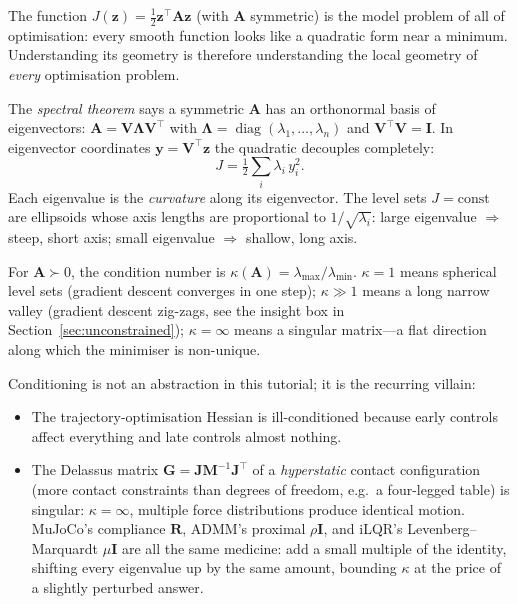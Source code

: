 \documentclass[11pt,twoside]{report}
\theoremstyle{definition}
\theoremstyle{plain}
\theoremstyle{remark}
\newcommand{\0}{\bm{0}}
\newcommand{\I}{\bm{I}}
\newcommand{\M}{\bm{M}}
\newcommand{\J}{\bm{J}}
\DeclareMathOperator{\diag}{diag}
\begin{document}
The function $J(\bm{z})=\tfrac12\bm{z}^{\!\top}\bm{A}\bm{z}$ (with
$\bm{A}$ symmetric) is the model problem of all of optimisation:
every smooth function looks like a quadratic form near a minimum.
Understanding its geometry is therefore understanding the local
geometry of \emph{every} optimisation problem.

The \emph{spectral theorem} says a symmetric $\bm{A}$ has an
orthonormal basis of eigenvectors:
$\bm{A}=\bm{V}\bm{\Lambda}\bm{V}^{\!\top}$ with
$\bm{\Lambda}=\diag(\lambda_{1},\ldots,\lambda_{n})$ and
$\bm{V}^{\!\top}\bm{V}=\I$. In eigenvector coordinates
$\bm{y}=\bm{V}^{\!\top}\bm{z}$ the quadratic decouples completely:
\begin{equation}
J=\tfrac12\sum_{i}\lambda_{i}\,y_{i}^{2}.
\end{equation}
Each eigenvalue is the \emph{curvature} along its eigenvector.
The level sets $J=\text{const}$ are ellipsoids whose axis lengths are
proportional to $1/\sqrt{\lambda_{i}}$: large eigenvalue $\Rightarrow$
steep, short axis; small eigenvalue $\Rightarrow$ shallow, long axis.

\begin{definitionbox}
For $\bm{A}\succ 0$, the condition number is
$\kappa(\bm{A})=\lambda_{\max}/\lambda_{\min}$.
$\kappa=1$ means spherical level sets (gradient descent converges in
one step); $\kappa\gg 1$ means a long narrow valley
(gradient descent zig-zags, see the insight box in
Section~\ref{sec:unconstrained}); $\kappa=\infty$ means a singular
matrix---a flat direction along which the minimiser is non-unique.
\end{definitionbox}

Conditioning is not an abstraction in this tutorial; it is the
recurring villain:
\begin{itemize}
\item The trajectory-optimisation Hessian is ill-conditioned because
      early controls affect everything and late controls almost nothing.
\item The Delassus matrix $\bm{G}=\J\M^{-1}\J^{\!\top}$ of a
      \emph{hyperstatic} contact configuration (more contact constraints
      than degrees of freedom, e.g.\ a four-legged table) is singular:
      $\kappa=\infty$, multiple force distributions produce identical
      motion. MuJoCo's compliance $\bm{R}$, ADMM's proximal $\rho\I$, and
      iLQR's Levenberg--Marquardt $\mu\I$ are all the same medicine:
      add a small multiple of the identity, shifting every eigenvalue
      up by the same amount, bounding $\kappa$ at the price of a
      slightly perturbed answer.
\end{itemize}
\end{document}

